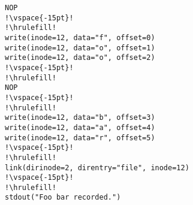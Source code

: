 \begin{lstlisting}[float=t, caption = {\textbf{Generated Micro-code. }{\em
\small The figure shows the micro-code generated for the system call trace
shown above. Note that while \smalltt{open()} and \smalltt{fsync()} cause
changes to book-keeping and ordering dependencies, they do not generate
micro-code. Inode 2 correspond to the root directory. Inode 12 corresponds to
the file \smalltt{x2VC}.}}, label = {lst-microcode}, escapechar=!]
NOP
!\vspace{-15pt}!
!\hrulefill!
write(inode=12, data="f", offset=0)
write(inode=12, data="o", offset=1)
write(inode=12, data="o", offset=2)
!\vspace{-15pt}!
!\hrulefill!
NOP
!\vspace{-15pt}!
!\hrulefill!
write(inode=12, data="b", offset=3)
write(inode=12, data="a", offset=4)
write(inode=12, data="r", offset=5)
!\vspace{-15pt}!
!\hrulefill!
link(dirinode=2, direntry="file", inode=12)
!\vspace{-15pt}!
!\hrulefill!
stdout("Foo bar recorded.")
\end{lstlisting}

